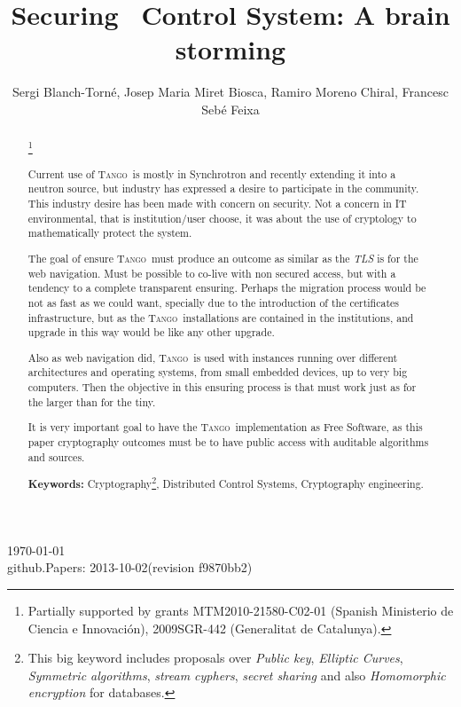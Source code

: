 \documentclass[10pt,a4paper,twoside]{llncs}
\title{Securing \tango\, Control System: A brain storming}
\author{Sergi Blanch-Torn\'e\inst{1}, Josep Maria Miret Biosca\inst{2}, Ramiro Moreno Chiral\inst{2}, Francesc Seb\'e Feixa\inst{2}}
\institute{
 Escola Polit\`ecnica Superior, Universitat de Lleida. Spain.\\
 \email{\tt sblanch@alumnes.udl.es}
 \and 
 Departament de Matem\`atica. Universitat de Lleida. Spain.\\
 \email{\tt \{miret,ramiro,fsebe\}@matematica.udl.es}
 }
\newcommand{\version}{github.Papers: 2013-10-02\;(revision f9870bb2) } %
\newcommand{\tango}{\textsc{Tango}}
\begin{document}
\maketitle
\begin{center}
 \today\\
 \version
\end{center}


\begin{abstract}\footnote{Partially supported by grants MTM2010-21580-C02-01 (Spanish Ministerio de Ciencia e Innovaci\'on), 2009SGR-442 (Generalitat de Catalunya).}

Current use of \tango\, is mostly in Synchrotron and recently extending it into a neutron source, but industry has expressed a desire to participate in the community. This industry desire has been made with concern on security. Not a concern in IT environmental, that is institution/user choose, it was about the use of cryptology to mathematically protect the system.

The goal of ensure \tango\, must produce an outcome as similar as the \emph{TLS} is for the web navigation. Must be possible to co-live with non secured access, but with a tendency to a complete transparent ensuring. Perhaps the migration process would be not as fast as we could want, specially due to the introduction of the certificates infrastructure, but as the \tango\, installations are contained in the institutions, and upgrade in this way would be like any other upgrade.

Also as web navigation did, \tango\, is used with instances running over different architectures and operating systems, from small embedded devices, up to very big computers. Then the objective in this ensuring process is that must work just as for the larger than for the tiny.

It is very important goal to have the \tango\, implementation as Free Software, as this paper cryptography outcomes must be to have public access with auditable algorithms and sources.
   
{\bf Keywords:} Cryptography\footnote{This big keyword includes proposals over \emph{Public key}, \emph{Elliptic Curves}, \emph{Symmetric algorithms}, \emph{stream cyphers}, \emph{secret sharing} and also \emph{Homomorphic encryption} for databases.}, Distributed Control Systems, Cryptography engineering.

\end{abstract}

\end{document}
